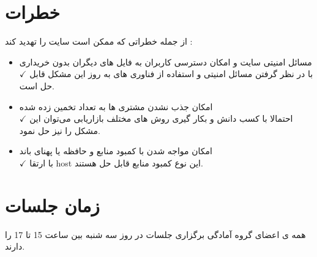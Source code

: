 \documentclass{article}
\begin{document}
	\section{خطرات}
	از جمله خطراتی که ممکن است سایت را تهدید کند :
	\begin{itemize}
		\item مسائل امنیتی سایت و امکان دسترسی کاربران به فایل های دیگران بدون خریداری  \\
		$ \checkmark $ با در نظر گرفتن مسائل امنیتی و استفاده از فناوری های به روز این مشکل قابل حل است.
		
		\item امکان جذب نشدن مشتری ها به تعداد تخمین زده شده  \\
		$ \checkmark $ احتمالا با کسب دانش و بکار گیری روش های مختلف بازاریابی می‌توان‌ این   مشکل را نیز حل نمود.
		
		\item امکان مواجه شدن با کمبود منابع و حافظه یا پهنای باند  \\
		$ \checkmark $ با ارتقا host این نوع کمبود منابع قابل حل هستند.
	\end{itemize}
	
	\section{زمان جلسات}
	همه ی اعضای گروه آمادگی برگزاری جلسات در روز سه شنبه بین ساعت 15 تا 17 را دارند.
\end{document}
